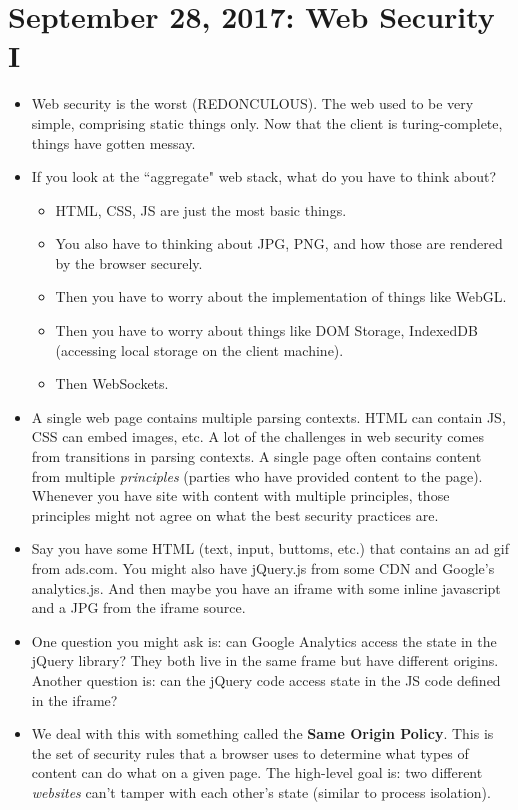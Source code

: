 \documentclass[12pt]{article}
\theoremstyle{definition}
\begin{document}
\section{September 28, 2017: Web Security I}
\begin{itemize}
    \itemsep0em 
	\item Web security is the worst (REDONCULOUS). The web used to be very simple, comprising static things only. Now that the client is turing-complete, things have gotten messay. 
    \item If you look at the ``aggregate" web stack, what do you have to think about?
    \begin{itemize}
        \item HTML, CSS, JS are just the most basic things.
        \item You also have to thinking about JPG, PNG, and how those are rendered by the browser securely.
        \item Then you have to worry about the implementation of things like WebGL.
        \item Then you have to worry about things like DOM Storage, IndexedDB (accessing local storage on the client machine). 
        \item Then WebSockets.
    \end{itemize}
    \item A single web page contains multiple parsing contexts. HTML can contain JS, CSS can embed images, etc. A lot of the challenges in web security comes from transitions in parsing contexts. A single page often contains content from multiple \textit{principles} (parties who have provided content to the page). Whenever you have site with content with multiple principles, those principles might not agree on what the best security practices are.
    \item Say you have some HTML (text, input, buttoms, etc.) that contains an ad gif from ads.com. You might also have jQuery.js from some CDN and Google's analytics.js. And then maybe you have an iframe with some inline javascript and a JPG from the iframe source.
    \item One question you might ask is: can Google Analytics access the state in the jQuery library? They both live in the same frame but have different origins. Another question is: can the jQuery code access state in the JS code defined in the iframe?
    \item We deal with this with something called the \textbf{Same Origin Policy}. This is the set of security rules that a browser uses to determine what types of content can do what on a given page. The high-level goal is: two different \textit{websites} can't tamper with each other's state (similar to process isolation).

\end{itemize}
\end{document}
